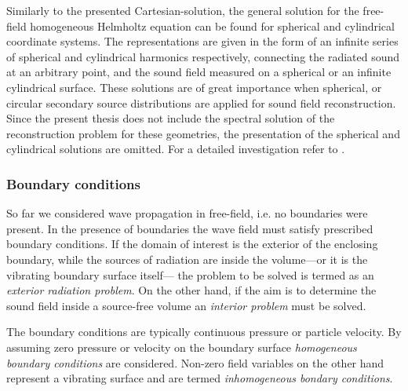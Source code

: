 \vspace{3mm}
Similarly to the presented Cartesian-solution, the general solution for the free-field homogeneous Helmholtz equation can be found for spherical and cylindrical coordinate systems. The representations are given in the form of an infinite series of spherical and cylindrical harmonics respectively, connecting the radiated sound at an arbitrary point, and the sound field measured on a spherical or an infinite cylindrical surface. These solutions are of great importance when spherical, or circular secondary source distributions are applied for sound field reconstruction. Since the present thesis does not include the spectral solution of the reconstruction problem for these geometries, the presentation of the spherical and cylindrical solutions are omitted. For a detailed investigation refer to \cite{Williams1999, Zotter2009phd, Ahrens2012}.

\subsubsection{Boundary conditions}
\label{Section:Theory:Boundary_conditions}

So far we considered wave propagation in free-field, i.e. no boundaries were present.%
In the presence of boundaries the wave field must satisfy prescribed boundary conditions.
If the domain of interest is the exterior of the enclosing boundary, while the sources of radiation are inside the volume---or it is the vibrating boundary surface itself--- the problem to be solved is termed as an \emph{exterior radiation problem}. On the other hand, if the aim is to determine the sound field inside a source-free volume an \emph{interior problem} must be solved.

The boundary conditions are typically continuous pressure or particle velocity. By assuming zero pressure or velocity on the boundary surface \emph{homogeneous boundary conditions} are considered. Non-zero field variables on the other hand represent a vibrating surface and are termed \emph{inhomogeneous bondary conditions}.

